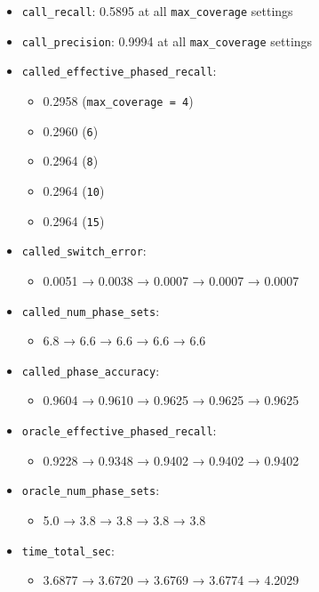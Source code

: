 \documentclass[
]{article}
\providecommand{\tightlist}{%
  \setlength{\itemsep}{0pt}\setlength{\parskip}{0pt}}
\begin{document}
\begin{itemize}
\tightlist
\item
  \texttt{call\_recall}: 0.5895 at all \texttt{max\_coverage} settings
\item
  \texttt{call\_precision}: 0.9994 at all \texttt{max\_coverage}
  settings
\item
  \texttt{called\_effective\_phased\_recall}:

  \begin{itemize}
  \tightlist
  \item
    0.2958 (\texttt{max\_coverage\ =\ 4})
  \item
    0.2960 (\texttt{6})
  \item
    0.2964 (\texttt{8})
  \item
    0.2964 (\texttt{10})
  \item
    0.2964 (\texttt{15})
  \end{itemize}
\item
  \texttt{called\_switch\_error}:

  \begin{itemize}
  \tightlist
  \item
    0.0051 → 0.0038 → 0.0007 → 0.0007 → 0.0007
  \end{itemize}
\item
  \texttt{called\_num\_phase\_sets}:

  \begin{itemize}
  \tightlist
  \item
    6.8 → 6.6 → 6.6 → 6.6 → 6.6
  \end{itemize}
\item
  \texttt{called\_phase\_accuracy}:

  \begin{itemize}
  \tightlist
  \item
    0.9604 → 0.9610 → 0.9625 → 0.9625 → 0.9625
  \end{itemize}
\item
  \texttt{oracle\_effective\_phased\_recall}:

  \begin{itemize}
  \tightlist
  \item
    0.9228 → 0.9348 → 0.9402 → 0.9402 → 0.9402
  \end{itemize}
\item
  \texttt{oracle\_num\_phase\_sets}:

  \begin{itemize}
  \tightlist
  \item
    5.0 → 3.8 → 3.8 → 3.8 → 3.8
  \end{itemize}
\item
  \texttt{time\_total\_sec}:

  \begin{itemize}
  \tightlist
  \item
    3.6877 → 3.6720 → 3.6769 → 3.6774 → 4.2029
  \end{itemize}
\end{itemize}
\end{document}
